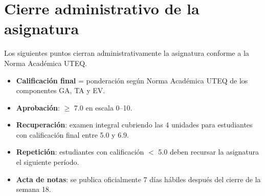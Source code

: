 \documentclass[11pt,a4paper,openany]{book}
\begin{document}
\section{Cierre administrativo de la asignatura}

Los siguientes puntos cierran administrativamente la
asignatura conforme a la Norma Académica UTEQ.


\begin{itemize}
\item \textbf{Calificación final} = ponderación según Norma Académica
UTEQ de los componentes GA, TA y EV.
\item \textbf{Aprobación}: $\geq$ 7.0 en escala 0--10.
\item \textbf{Recuperación}: examen integral cubriendo las 4 unidades
para estudiantes con calificación final entre 5.0 y 6.9.
\item \textbf{Repetición}: estudiantes con calificación $<$ 5.0 deben
recursar la asignatura el siguiente período.
\item \textbf{Acta de notas}: se publica oficialmente 7 días hábiles
después del cierre de la semana 18.
\end{itemize}



\end{document}
